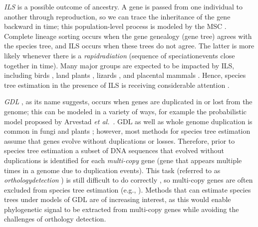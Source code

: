 \textit{\Gls{ILS}} \cite{avise1983mitochondrial, pamilo1988relationships, takahata1989gene-msd, maddison1997gene} is a possible outcome of ancestry.
A gene is passed from one individual to another through reproduction, so we can trace the inheritance of the gene backward in time; this population-level process is modeled by the \gls{MSC} \cite{tajima1983evolutionary, pamilo1988relationships, rosenberg2002probability, rannala2003bayes}.
Complete lineage sorting occurs when the gene genealogy (gene tree) agrees with the species tree, and ILS occurs when these trees do not agree.
The latter is more likely whenever there is a \textit{\gls{rapidradiation}} (sequence of \glspl{speciationevent} close together in time).
Many major groups are expected to be impacted by ILS, including birds \cite{jarvis2014whole}, land plants \cite{wickett2014phylo, leebensmack2019one}, lizards \cite{linkem2016detecting}, and placental mammals \cite{mccormack2012ultraconserved}. 
Hence, species tree estimation in the presence of ILS is receiving considerable attention \cite{degnan2009gene, edwards2009is, edwards2016implementing}.

\textit{\Gls{GDL}} \cite{ohno1970evol}, as its name suggests, occurs when genes are duplicated in or lost from the genome; this can be modeled in a variety of ways, for example the probabilistic model proposed by Arvestad {\em et al.}~\cite{arvestad2003bayesian}.
GDL as well as whole genome duplication is common in fungi \cite{butler2009evolution} and plants \cite{leebensmack2019one}; however, most methods for species tree estimation assume that genes evolve without duplications or losses.
Therefore, prior to species tree estimation a subset of DNA sequences that evolved without duplications is identified for each \textit{\gls{multi-copy}} gene (gene that appears multiple times in a genome due to duplication events).
This task (referred to as \textit{\gls{orthologydetection}} \cite{fitch2000homology, moreira2000molecular}) is still difficult to do correctly \cite{quest2014big, lafond2018accurate, altenhoff2019inferring}, so multi-copy genes are often excluded from species tree estimation (e.g., \cite{wickett2014phylo, leebensmack2019one}).
Methods that can estimate species trees under models of GDL are of increasing interest, as this would enable phylogenetic signal to be extracted from multi-copy genes while avoiding the challenges of orthology detection.

